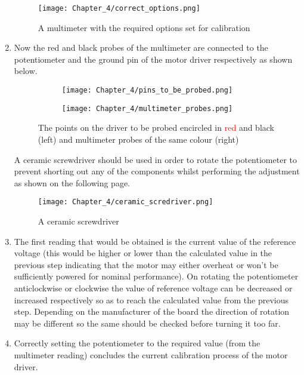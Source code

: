 \begin{enumerate}
       \begin{figure}[h]
        \centering
        \texttt{[image: Chapter\_4/correct\_options.png]}
        \caption{A multimeter with the required options set for calibration}
        \label{fig:correct_options}
       \end{figure}


 \item Now the red and black probes of the multimeter are connected to the potentiometer and the ground pin of the motor driver respectively as shown below.

       \begin{figure}[h]
        \hspace{20mm}
        \begin{subfigure}{0.5\textwidth}
         \texttt{[image: Chapter\_4/pins\_to\_be\_probed.png]}
         \label{fig:to_be_probed}
        \end{subfigure}
        \hspace{-20mm}
        \begin{subfigure}{0.5\textwidth}
         \texttt{[image: Chapter\_4/multimeter\_probes.png]}
         \label{fig:multimeter_probes}
        \end{subfigure}

        \caption{The points on the driver to be probed encircled in \textcolor{red}{red} and black (left) and multimeter probes of the same colour (right)}
        \label{fig:probes}
       \end{figure}


       A ceramic screwdriver should be used in order to rotate the potentiometer to prevent shorting out any of the components whilst performing the adjustment as shown on the following page.

       \begin{figure}[h]
        \centering
        \texttt{[image: Chapter\_4/ceramic\_scredriver.png]}
        \caption{A ceramic screwdriver}
        \label{fig:ceramic_scredriver}
       \end{figure}

 \item   The first reading that would be obtained is the current value of the reference voltage (this would be higher or lower than the calculated value in the previous step indicating that the motor may either overheat or won’t be sufficiently powered for nominal performance). On rotating the potentiometer anticlockwise or clockwise the value of reference voltage can be decreased or increased respectively so as to reach the calculated value from the previous step. Depending on the manufacturer of the board the direction of rotation may be different so the same should be checked before turning it too far.

 \item  Correctly setting the potentiometer to the required value (from the multimeter reading) concludes the current calibration process of the motor driver.
\end{enumerate}


